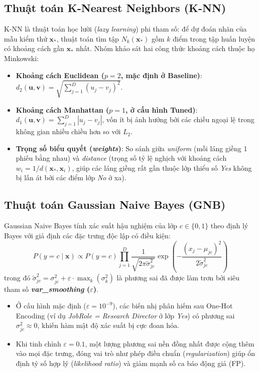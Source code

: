 \subsection{Thuật toán K-Nearest Neighbors (K-NN)}
K-NN là thuật toán học lười (\textit{lazy learning}) phi tham số: để dự đoán nhãn của mẫu kiểm thử $\mathbf{x}_*$, thuật toán tìm tập $N_k(\mathbf{x}_*)$ gồm $k$ điểm trong tập huấn luyện có khoảng cách gần $\mathbf{x}_*$ nhất. Nhóm khảo sát hai công thức khoảng cách thuộc họ Minkowski:
\begin{itemize}
    \item \textbf{Khoảng cách Euclidean ($p=2$, mặc định ở Baseline)}: $d_2(\mathbf{u}, \mathbf{v}) = \sqrt{\sum_{j=1}^D (u_j - v_j)^2}$.
    \item \textbf{Khoảng cách Manhattan ($p=1$, ở cấu hình Tuned)}: $d_1(\mathbf{u}, \mathbf{v}) = \sum_{j=1}^D |u_j - v_j|$, vốn ít bị ảnh hưởng bởi các chiều ngoại lệ trong không gian nhiều chiều hơn so với $L_2$.
    \item \textbf{Trọng số biểu quyết (\textit{weights})}: So sánh giữa \textit{uniform} (mỗi láng giềng 1 phiếu bằng nhau) và \textit{distance} (trọng số tỷ lệ nghịch với khoảng cách $w_i = 1 / d(\mathbf{x}_*, \mathbf{x}_i)$, giúp các láng giềng rất gần thuộc lớp thiểu số \textit{Yes} không bị lấn át bởi các điểm lớp \textit{No} ở xa).
\end{itemize}

\subsection{Thuật toán Gaussian Naive Bayes (GNB)}
Gaussian Naive Bayes tính xác suất hậu nghiệm của lớp $c \in \{0, 1\}$ theo định lý Bayes với giả định các đặc trưng độc lập có điều kiện:
\[
    P(y = c \mid \mathbf{x}) \propto P(y = c) \prod_{j=1}^{D} \frac{1}{\sqrt{2\pi \tilde{\sigma}_{jc}^2}} \exp\left( -\frac{(x_j - \mu_{jc})^2}{2\tilde{\sigma}_{jc}^2} \right)
\]
trong đó $\tilde{\sigma}_{jc}^2 = \sigma_{jc}^2 + \varepsilon \cdot \max_{k}(\sigma_k^2)$ là phương sai đã được làm trơn bởi siêu tham số \textbf{\textit{var\_smoothing} ($\varepsilon$)}.
\begin{itemize}
    \item Ở cấu hình mặc định ($\varepsilon = 10^{-9}$), các biến nhị phân hiếm sau One-Hot Encoding (ví dụ \textit{JobRole = Research Director} ở lớp \textit{Yes}) có phương sai $\sigma_{jc}^2 \approx 0$, khiến hàm mật độ xác suất bị cực đoan hóa.
    \item Khi tinh chỉnh $\varepsilon = 0.1$, một lượng phương sai nền đồng nhất được cộng thêm vào mọi đặc trưng, đóng vai trò như phép điều chuẩn (\textit{regularization}) giúp ổn định tỷ số hợp lý (\textit{likelihood ratio}) và giảm mạnh số ca báo động giả (FP).
\end{itemize}

